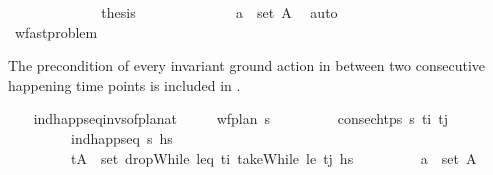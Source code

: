 \begin{isabellebody}
\ \ \ \ \ \ \ \ \ \ \isamarkupfalse%
\ \isamarkupfalse%
\ {\isacharquery}{\kern0pt}thesis\isanewline
\ \ \ \ \ \ \ \ \ \ \ \ \isamarkupfalse%
\ {\isacartoucheopen}a\ {\isasymin}\ set\ A{\isacharprime}{\kern0pt}{\isacartoucheclose}\ \isamarkupfalse%
\ auto\isanewline
\ \ \ \ \ \ \isamarkupfalse%
\isanewline
\ \ \ \ \isamarkupfalse%
\isanewline
\ \ \isamarkupfalse%
%
\endisatagproof
{\isafoldproof}%
%
\isadelimproof
\isanewline
%
\endisadelimproof
{}\isamarkupfalse%
\isanewline
\isanewline
{}\isamarkupfalse%
\ wf{\isacharunderscore}{\kern0pt}ast{\isacharunderscore}{\kern0pt}problem\isanewline
{}%
\begin{isamarkuptext}%
The precondition of every invariant ground action in between two consecutive 
  happening time points is included in .%
\end{isamarkuptext}\isamarkuptrue%
\ \ \isamarkupfalse%
\ ind{\isacharunderscore}{\kern0pt}happ{\isacharunderscore}{\kern0pt}seq{\isacharunderscore}{\kern0pt}invs{\isacharunderscore}{\kern0pt}of{\isacharunderscore}{\kern0pt}plan{\isacharunderscore}{\kern0pt}at{\isacharcolon}{\kern0pt}\isanewline
\ \ \ \ \ {\isachardoublequoteopen}wf{\isacharunderscore}{\kern0pt}plan\ {\isasympi}s{\isachardoublequoteclose}\isanewline
\ \ \ \ \ \ \ \ \ {\isachardoublequoteopen}consec{\isacharunderscore}{\kern0pt}htps\ {\isasympi}s\ t\isactrlsub i\ t\isactrlsub j{\isachardoublequoteclose}\isanewline
\ \ \ \ \ \ \ \ \ {\isachardoublequoteopen}ind{\isacharunderscore}{\kern0pt}happ{\isacharunderscore}{\kern0pt}seq\ {\isasympi}s\ hs{\isachardoublequoteclose}\isanewline
\ \ \ \ \ \ \ \ \ {\isachardoublequoteopen}{\isacharparenleft}{\kern0pt}t{\isacharcomma}{\kern0pt}A{\isacharparenright}{\kern0pt}\ {\isasymin}\ set\ {\isacharparenleft}{\kern0pt}dropWhile\ {\isacharparenleft}{\kern0pt}leq\ t\isactrlsub i{\isacharparenright}{\kern0pt}\ {\isacharparenleft}{\kern0pt}takeWhile\ {\isacharparenleft}{\kern0pt}le\ t\isactrlsub j{\isacharparenright}{\kern0pt}\ hs{\isacharparenright}{\kern0pt}{\isacharparenright}{\kern0pt}{\isachardoublequoteclose}\isanewline
\ \ \ \ \ \ \ \ \ {\isachardoublequoteopen}a\ {\isasymin}\ set\ A{\isachardoublequoteclose}\isanewline

\end{isabellebody}
